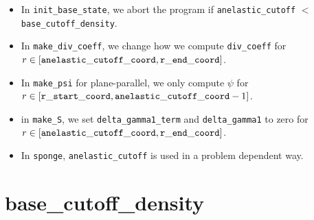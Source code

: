 \begin{itemize}

\item In {\tt init\_base\_state}, we abort the program if 
  {\tt anelastic\_cutoff} $<$ {\tt base\_cutoff\_density}.

\item In {\tt make\_div\_coeff}, we change how we compute {\tt div\_coeff} 
  for $r\in[{\tt anelastic\_cutoff\_coord},{\tt r\_end\_coord}]$.

\item In {\tt make\_psi} for plane-parallel, we only compute $\psi$ for 
  $r\in[{\tt r\_start\_coord},{\tt anelastic\_cutoff\_coord}-1]$.

\item in {\tt make\_S}, we set {\tt delta\_gamma1\_term} and {\tt delta\_gamma1} 
  to zero for $r\in[{\tt anelastic\_cutoff\_coord},{\tt r\_end\_coord}]$.

\item In {\tt sponge}, {\tt anelastic\_cutoff} is used in a problem
  dependent way.

\end{itemize}

\section{base\_cutoff\_density}

